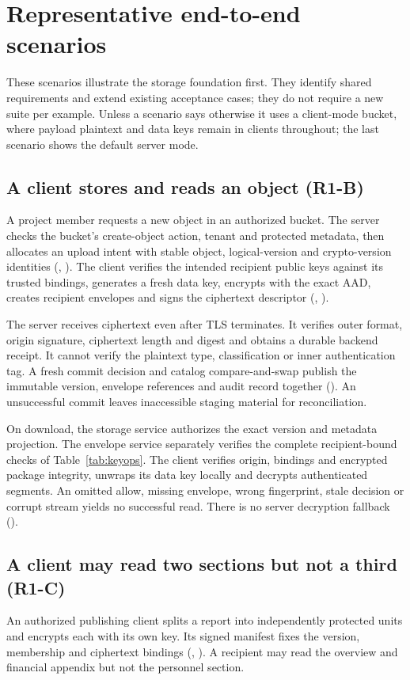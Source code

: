 \section{Representative end-to-end scenarios}\label{app:scenarios}
These scenarios illustrate the storage foundation first. They identify shared requirements and extend existing acceptance cases; they do not require a new suite per example. Unless a scenario says otherwise it uses a client-mode bucket, where payload plaintext and data keys remain in clients throughout; the last scenario shows the default server mode.

\subsection{A client stores and reads an object (R1-B)}
A project member requests a new object in an authorized bucket. The server checks the bucket's create-object action, tenant and protected metadata, then allocates an upload intent with stable object, logical-version and crypto-version identities (, ). The client verifies the intended recipient public keys against its trusted bindings, generates a fresh data key, encrypts with the exact AAD, creates recipient envelopes and signs the ciphertext descriptor (, ).

The server receives ciphertext even after TLS terminates. It verifies outer format, origin signature, ciphertext length and digest and obtains a durable backend receipt. It cannot verify the plaintext type, classification or inner authentication tag. A fresh commit decision and catalog compare-and-swap publish the immutable version, envelope references and audit record together (). An unsuccessful commit leaves inaccessible staging material for reconciliation.

On download, the storage service authorizes the exact version and metadata projection. The envelope service separately verifies the complete recipient-bound checks of Table~\ref{tab:keyops}. The client verifies origin, bindings and encrypted package integrity, unwraps its data key locally and decrypts authenticated segments. An omitted allow, missing envelope, wrong fingerprint, stale decision or corrupt stream yields no successful read. There is no server decryption fallback ().

\subsection{A client may read two sections but not a third (R1-C)}
An authorized publishing client splits a report into independently protected units and encrypts each with its own key. Its signed manifest fixes the version, membership and ciphertext bindings (, ). A recipient may read the overview and financial appendix but not the personnel section.

